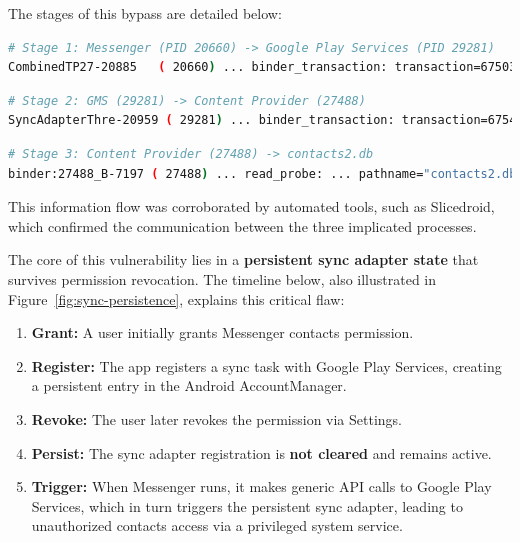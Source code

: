 \documentclass[a4paper,12pt]{report}
\begin{document}
The stages of this bypass are detailed below:

\begin{lstlisting}[language=bash, caption={Stage 1: Messenger to Google Play Services.}, label={lst:stage1-bypass}]
# Stage 1: Messenger (PID 20660) -> Google Play Services (PID 29281)
CombinedTP27-20885   ( 20660) ... binder_transaction: transaction=6750378 dest_proc=29281 ...
\end{lstlisting}

\begin{lstlisting}[language=bash, caption={Stage 2: Google Play Services to Content Provider.}, label={lst:stage2-bypass}]
# Stage 2: GMS (29281) -> Content Provider (27488)
SyncAdapterThre-20959 ( 29281) ... binder_transaction: transaction=6754221 dest_proc=27488 ...
\end{lstlisting}

\begin{lstlisting}[language=bash, caption={Stage 3: Content Provider to contacts database.}, label={lst:stage3-bypass}]
# Stage 3: Content Provider (27488) -> contacts2.db
binder:27488_B-7197 ( 27488) ... read_probe: ... pathname="contacts2.db"
\end{lstlisting}

This information flow was corroborated by automated tools, such as Slicedroid, which confirmed the communication between the three implicated processes.


The core of this vulnerability lies in a \textbf{persistent sync adapter state} that survives permission revocation. The timeline below, also illustrated in Figure~\ref{fig:sync-persistence}, explains this critical flaw:

\begin{enumerate}
    \item \textbf{Grant:} A user initially grants Messenger contacts permission.
    \item \textbf{Register:} The app registers a sync task with Google Play Services, creating a persistent entry in the Android AccountManager.
    \item \textbf{Revoke:} The user later revokes the permission via Settings.
    \item \textbf{Persist:} The sync adapter registration is \textbf{not cleared} and remains active.
    \item \textbf{Trigger:} When Messenger runs, it makes generic API calls to Google Play Services, which in turn triggers the persistent sync adapter, leading to unauthorized contacts access via a privileged system service.
\end{enumerate}
\end{document}
